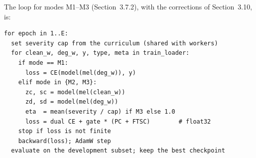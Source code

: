 \documentclass[12pt,a4paper]{report}
\begin{document}
The loop for modes M1--M3 (Section~3.7.2), with the corrections of Section~3.10, is:

\begingroup
\small
\begin{verbatim}
for epoch in 1..E:
  set severity cap from the curriculum (shared with workers)
  for clean_w, deg_w, y, type, meta in train_loader:
    if mode == M1:
      loss = CE(model(mel(deg_w)), y)
    elif mode in {M2, M3}:
      zc, sc = model(mel(clean_w))
      zd, sd = model(mel(deg_w))
      eta  = mean(severity / cap) if M3 else 1.0
      loss = dual CE + gate * (PC + FTSC)        # float32
    stop if loss is not finite
    backward(loss); AdamW step
  evaluate on the development subset; keep the best checkpoint
\end{verbatim}
\endgroup
\end{document}
